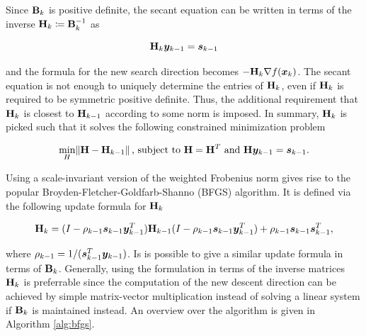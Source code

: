 Since $\mathbf{B}_k$ is positive definite, the secant equation can be written in terms of the inverse $\mathbf{H}_k \coloneqq \mathbf{B}^{-1}_k$ as

\[
    \mathbf{H}_k \bm{y}_{k-1} = \bm{s}_{k-1}
\]

\noindent and the formula for the new search direction becomes $-\mathbf{H}_k \nabla f(\bm{x}_k)$. The secant equation is not enough to uniquely determine
the entries of $\mathbf{H}_k$, even if $\mathbf{H}_k$ is required to be symmetric positive definite. Thus, the additional requirement that $\mathbf{H}_k$
is closest to $\mathbf{H}_{k-1}$ according to some norm is imposed. In summary, $\mathbf{H}_k$ is picked such that it solves the following constrained
minimization problem

\begin{align*}
    \min_{H} \norm{\mathbf{H} - \mathbf{H}_{k-1}} \text{, subject to } \mathbf{H} = \mathbf{H}^T \text{ and } \mathbf{H}\bm{y}_{k-1} = \bm{s}_{k-1}.
\end{align*}

Using a scale-invariant version of the weighted Frobenius norm gives rise to the popular Broyden-Fletcher-Goldfarb-Shanno (BFGS) algorithm.
It is defined via the following update formula for $\mathbf{H}_k$

\begin{equation}\label{eq:bfgs-update}
    \mathbf{H}_k = (I - \rho_{k-1}\bm{s}_{k-1}\bm{y}^T_{k-1})\mathbf{H}_{k-1}(I - \rho_{k-1}\bm{s}_{k-1}\bm{y}^T_{k-1}) + \rho_{k-1}\bm{s}_{k-1}\bm{s}^T_{k-1},
\end{equation}

\noindent where $\rho_{k-1} = 1 / (\bm{s}^T_{k-1}\bm{y}_{k-1})$. Is is possible to give a similar update formula in terms of $\mathbf{B}_k$.
Generally, using the formulation in terms of the inverse matrices $\mathbf{H}_k$ is preferrable since the computation of the new descent 
direction can
be achieved by simple matrix-vector multiplication instead of solving a linear system if $\mathbf{B}_k$ is maintained instead. An overview over the
algorithm is given in Algorithm \ref{alg:bfgs}.

